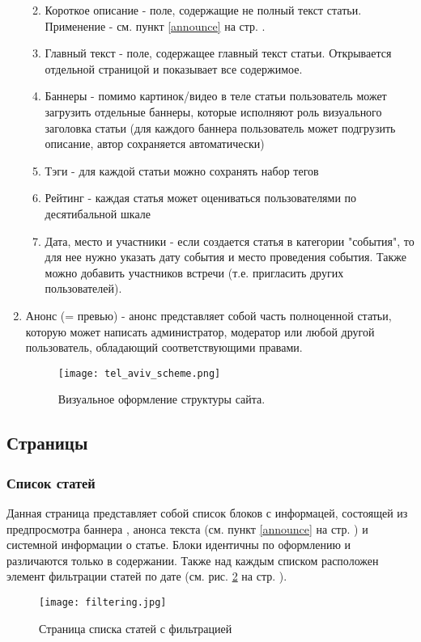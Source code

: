 \documentclass[DIV=calc, paper=a4, fontsize=11pt]{scrartcl} %
\begin{document}
\begin{enumerate}
\begin{enumerate}
\begin{figure}[ht!]
        \end{figure}
    \item{Короткое описание} - поле, содержащие не полный текст статьи. Применение - см. пункт \ref{announce} на стр. \pageref{announce}.
    \item{Главный текст} - поле, содержащее главный текст статьи. Открывается отдельной страницой и показывает все содержимое.
    \item{Баннеры} - помимо картинок/видео в теле статьи пользователь может загрузить отдельные баннеры, которые исполняют роль визуального заголовка статьи (для каждого баннера пользователь может подгрузить описание, автор сохраняется автоматически)
    \item{Тэги} - для каждой статьи можно сохранять набор тегов
    \item{Рейтинг} - каждая статья может оцениваться пользователями по десятибальной шкале
    \item{Дата, место и участники} - если создается статья в категории "события", то для нее нужно указать дату события и место проведения события. Также можно добавить участников встречи (т.е. пригласить других пользователей). 
    \end{enumerate}
\item \label{announce}{Анонс} (= превью) - анонс представляет собой часть полноценной статьи, которую может написать администратор, модератор или любой другой пользователь, обладающий соответствующими правами.

        \begin{figure}[H]
        \centering
        \texttt{[image: tel\_aviv\_scheme.png]}
        \caption{Визуальное оформление структуры сайта. \label{fig:tel_aviv_scheme.png}}
        \end{figure}

\end{enumerate}

\subsection{Страницы}
\subsubsection{Список статей}
Данная страница представляет собой список блоков с информацей, состоящей из предпросмотра баннера , анонса текста (см. пункт \ref{announce} на стр. \pageref{announce}) и системной информации о статье. Блоки идентичны по оформлению и различаются только в содержании. Также над каждым списком расположен элемент фильтрации статей по дате (см. рис. \ref{fig:filtering.jpg} на стр. \pageref{fig:filtering.jpg}).
            \begin{figure}[ht!]
            \centering
            \texttt{[image: filtering.jpg]}
            \caption{Страница списка статей с фильтрацией \label{fig:filtering.jpg}}
            \end{figure}
\end{document}
